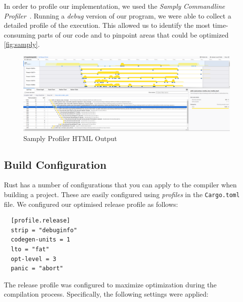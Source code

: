 \documentclass[11pt]{report}
\theoremstyle{definition}
\theoremstyle{plain}
\begin{document}
In order to profile our implementation, we used the \textit{Samply Commandline Profiler}~\cite{samply}. Running a \textit{debug} version of our program, we were able to collect a detailed profile of the execution. This allowed us to identify the most time-consuming parts of our code and to pinpoint areas that could be optimized \autoref{fig:samply}.

\begin{figure}[H]
  \centering
  \includegraphics[width=\textwidth]{images/samply.png}
  \caption{Samply Profiler HTML Output}
  \label{fig:samply}
\end{figure}


\subsection{Build Configuration}

Rust has a number of configurations that you can apply to the compiler when building a project. These are easily configured using \textit{profiles} in the \texttt{Cargo.toml} file. We configured our optimised release profile as follows:

\begin{verbatim}
  [profile.release]
  strip = "debuginfo"
  codegen-units = 1  
  lto = "fat"        
  opt-level = 3      
  panic = "abort"
\end{verbatim}

The release profile was configured to maximize optimization during the compilation process. Specifically, the following settings were applied:
\end{document}
